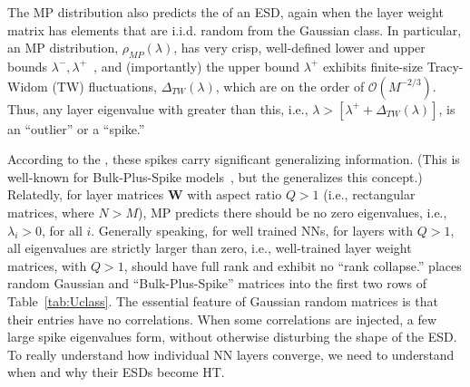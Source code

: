The MP distribution also predicts the \SCALE of an ESD, again when the layer weight matrix has elements that are i.i.d. random from the Gaussian \Universality class.
In particular, an MP distribution, $\rho_{MP}(\lambda)$, has very crisp, well-defined lower and upper bounds $\lambda^{-},\lambda^{+}$~\cite{MM18_TR_JMLRversion}, and (importantly) the upper bound $\lambda^{+}$ exhibits finite-size Tracy-Widom (TW) fluctuations, $\Delta_{TW}(\lambda)$, which are on the order of $\mathcal{O}(M^{-2/3})$. 
Thus, any layer eigenvalue with \SCALE greater than this, i.e., $\lambda>[\lambda^{+}+\Delta_{TW}(\lambda)]$, is an ``outlier'' or a ``spike.''

According to the \HTSR \Phenomenology, these spikes carry significant generalizing information. 
(This is well-known for Bulk-Plus-Spike models~\cite{MM18_TR_JMLRversion}, but the \HTSR \Phenomenology generalizes this concept.)
%
Relatedly, for layer matrices $\mathbf{W}$ with aspect ratio $Q>1$ (i.e., rectangular matrices, where $N>M$), MP \RMT predicts there should be no zero eigenvalues, i.e., $\lambda_i>0$, for all $i$. 
Generally speaking, for well trained NNs, for layers with $Q>1$, all eigenvalues are strictly larger than zero, i.e., 
well-trained layer weight matrices, with $Q>1$, should have full rank and exhibit no ``rank collapse.'' 
\HTSR places random Gaussian and ``Bulk-Plus-Spike'' matrices into the first two rows of Table~\ref{tab:Uclass}.
The essential feature of Gaussian random matrices is that their entries have no correlations. 
When some correlations are injected, a few large spike eigenvalues form, without otherwise disturbing the shape of the ESD. 
To really understand how individual NN layers converge, we need to understand when and why their ESDs become HT.

%


